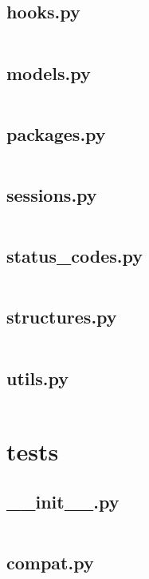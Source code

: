 \documentclass{article}
\begin{document}
\subsection{hooks.py}
\inputminted{python}{/tmp/requests/requests/hooks.py}
\newpage

\subsection{models.py}
\inputminted{python}{/tmp/requests/requests/models.py}
\newpage

\subsection{packages.py}
\inputminted{python}{/tmp/requests/requests/packages.py}
\newpage

\subsection{sessions.py}
\inputminted{python}{/tmp/requests/requests/sessions.py}
\newpage

\subsection{status\_codes.py}
\inputminted{python}{/tmp/requests/requests/status_codes.py}
\newpage

\subsection{structures.py}
\inputminted{python}{/tmp/requests/requests/structures.py}
\newpage

\subsection{utils.py}
\inputminted{python}{/tmp/requests/requests/utils.py}
\newpage

\section{tests}

\subsection{\_\_init\_\_.py}
\inputminted{python}{/tmp/requests/tests/__init__.py}
\newpage

\subsection{compat.py}
\inputminted{python}{/tmp/requests/tests/compat.py}
\newpage
\end{document}
